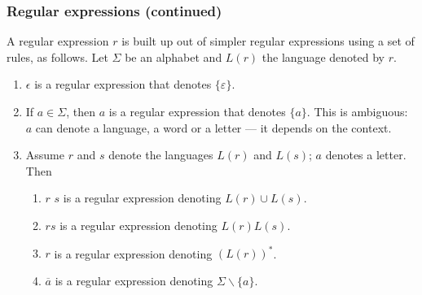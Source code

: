 %
\begin{frame}
\frametitle{Regular expressions (continued)}

A regular expression \(r\) is built up out of simpler regular
expressions using a set of rules, as follows. Let \(\Sigma\)
be an alphabet and \(L(r)\) the language denoted by \(r\).
\begin{enumerate}

   \item \(\epsilon\) is a regular expression that denotes
     \(\{\varepsilon\}\). \label{regexp_empty}

   \item If \(a \in \Sigma\), then \(a\) is a regular expression that
     denotes \(\{a\}\). This is ambiguous: \(a\) can denote a
     language, a word or a letter --- it depends on the
     context. \label{regexp_sym}

   \item Assume \(r\) and \(s\) denote the languages \(L(r)\) and
     \(L(s)\); \(a\) denotes a letter. Then \label{regexp_rec}
   \begin{enumerate}

     \item \(r\) \disj \(s\) is a regular expression
     denoting \(L(r) \cup L(s)\).

     \item \(r s\) is a regular expression denoting \(L(r) L(s)\).

     \item \(r\)\kleene{} is a regular expression
     denoting \((L(r))^{*}\).


     \item \(\overline{a}\) is a regular expression denoting
       \(\Sigma\backslash \{a\}\).

   \end{enumerate}

\end{enumerate}

\end{frame}


